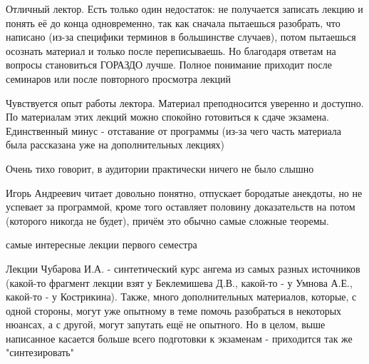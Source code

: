             \begin{commentbox} 
                Отличный лектор. Есть только один недостаток: не получается записать лекцию и понять её до конца одновременно, так как сначала пытаешься разобрать, что написано (из-за специфики терминов в большинстве случаев), потом пытаешься осознать материал и только после переписываешь. Но благодаря ответам на вопросы становиться ГОРАЗДО лучше. Полное понимание приходит после семинаров или после повторного просмотра лекций 
            \end{commentbox} 
        
            \begin{commentbox} 
                Чувствуется опыт работы лектора. Материал преподносится уверенно и доступно. По материалам этих лекций можно спокойно готовиться к сдаче экзамена. Единственный минус - отставание от программы (из-за чего часть материала была рассказана уже на дополнительных лекциях) 
            \end{commentbox} 
        
            \begin{commentbox} 
                Очень тихо говорит, в аудитории практически ничего не было слышно 
            \end{commentbox} 
        
            \begin{commentbox} 
                Игорь Андреевич читает довольно понятно, отпускает бородатые анекдоты, но не успевает за программой, кроме того оставляет половину доказательств на потом (которого никогда не будет), причём это обычно самые сложные теоремы.   
            \end{commentbox} 
        
            \begin{commentbox} 
                самые интересные лекции первого семестра 
            \end{commentbox} 
        
            \begin{commentbox} 
                Лекции Чубарова И.А. - синтетический курс ангема из самых разных источников (какой-то фрагмент лекции взят у Беклемишева Д.В., какой-то - у Умнова А.Е., какой-то - у Кострикина). Также, много дополнительных материалов, которые, с одной стороны, могут уже опытному в теме помочь разобраться в некоторых нюансах, а с другой, могут запутать ещё не опытного. Но в целом, выше написанное касается больше всего подготовки к экзаменам - приходится так же "синтезировать" 
            \end{commentbox}


